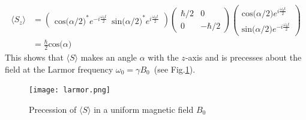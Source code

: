 \begin{equation}
\begin{split}
\langle S_{z} \rangle & =  \begin{pmatrix} \textrm{cos($\alpha$/2)}^{*} e^{-i \frac{\omega_{0}t}{2}} \,\,\, \textrm{sin($\alpha$/2)}^{*} e^{i \frac{\omega_{0}t}{2}} \end{pmatrix}  \begin{pmatrix} \hbar/2 & 0\\ 0 & -\hbar/2 \end{pmatrix}\begin{pmatrix} \textrm{cos($\alpha$/2)} e^{i \frac{\omega_{0}t}{2}}\\ \textrm{sin($\alpha$/2)} e^{-i \frac{\omega_{0}t}{2}} \end{pmatrix} \\
& = \frac{\hbar}{2}\textrm{cos($\alpha$)}
\end{split}
\end{equation}
This shows that $\langle S \rangle$ makes an angle $\alpha$ with the
$z$-axis and is precesses about the field at the Larmor frequency
$\omega_0 = \gamma B_0$~(see Fig.\ref{fig:larmor}).
\begin{figure}[h!]
  \centering
  \texttt{[image: larmor.png]}
  \caption{Precession of $\langle S \rangle$ in a uniform magnetic
    field $B_0$}
  \label{fig:larmor}
\end{figure}

